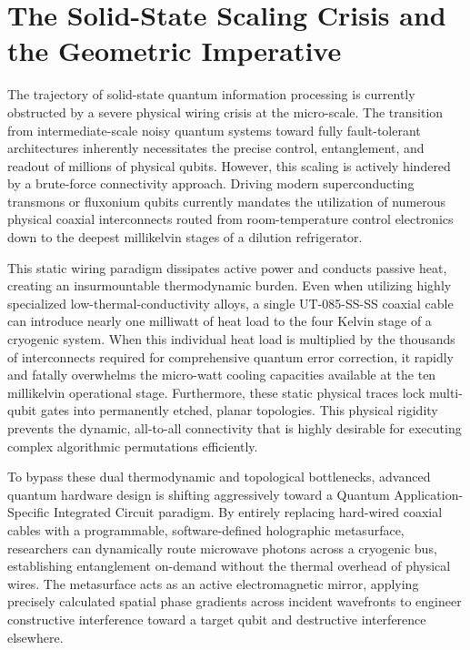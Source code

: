 \documentclass[11pt, a4paper]{article}
\begin{document}
\section{The Solid-State Scaling Crisis and the Geometric Imperative}

The trajectory of solid-state quantum information processing is currently obstructed by a severe physical wiring crisis at the micro-scale. The transition from intermediate-scale noisy quantum systems toward fully fault-tolerant architectures inherently necessitates the precise control, entanglement, and readout of millions of physical qubits. However, this scaling is actively hindered by a brute-force connectivity approach. Driving modern superconducting transmons or fluxonium qubits currently mandates the utilization of numerous physical coaxial interconnects routed from room-temperature control electronics down to the deepest millikelvin stages of a dilution refrigerator.

This static wiring paradigm dissipates active power and conducts passive heat, creating an insurmountable thermodynamic burden. Even when utilizing highly specialized low-thermal-conductivity alloys, a single UT-085-SS-SS coaxial cable can introduce nearly one milliwatt of heat load to the four Kelvin stage of a cryogenic system. When this individual heat load is multiplied by the thousands of interconnects required for comprehensive quantum error correction, it rapidly and fatally overwhelms the micro-watt cooling capacities available at the ten millikelvin operational stage. Furthermore, these static physical traces lock multi-qubit gates into permanently etched, planar topologies. This physical rigidity prevents the dynamic, all-to-all connectivity that is highly desirable for executing complex algorithmic permutations efficiently.

To bypass these dual thermodynamic and topological bottlenecks, advanced quantum hardware design is shifting aggressively toward a Quantum Application-Specific Integrated Circuit paradigm. By entirely replacing hard-wired coaxial cables with a programmable, software-defined holographic metasurface, researchers can dynamically route microwave photons across a cryogenic bus, establishing entanglement on-demand without the thermal overhead of physical wires. The metasurface acts as an active electromagnetic mirror, applying precisely calculated spatial phase gradients across incident wavefronts to engineer constructive interference toward a target qubit and destructive interference elsewhere.
\end{document}
